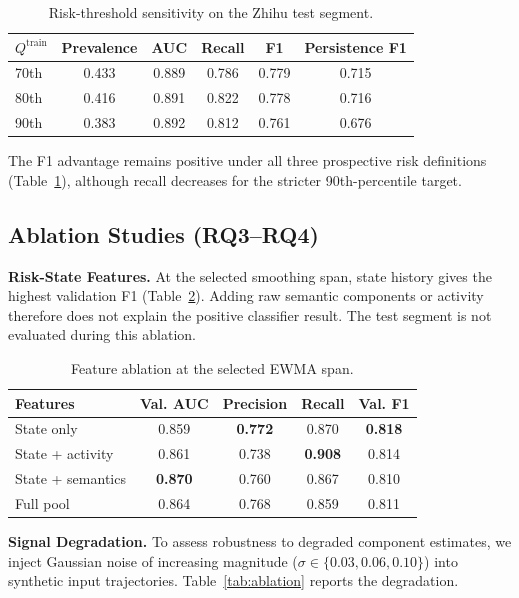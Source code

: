 \documentclass[11pt,a4paper]{article}
\begin{document}
\begin{table}[ht]
\centering
\caption{Risk-threshold sensitivity on the Zhihu test segment.}
\label{tab:threshold_sensitivity}
\begin{tabular}{lccccc}
\toprule
$Q^{\mathrm{train}}$ & \textbf{Prevalence} & \textbf{AUC} & \textbf{Recall} & \textbf{F1} & \textbf{Persistence F1} \\
\midrule
70th & 0.433 & 0.889 & 0.786 & 0.779 & 0.715 \\
80th & 0.416 & 0.891 & 0.822 & 0.778 & 0.716 \\
90th & 0.383 & 0.892 & 0.812 & 0.761 & 0.676 \\
\bottomrule
\end{tabular}
\end{table}

The F1 advantage remains positive under all three prospective risk definitions (Table~\ref{tab:threshold_sensitivity}), although recall decreases for the stricter 90th-percentile target.

\subsection{Ablation Studies (RQ3--RQ4)}

\textbf{Risk-State Features.} At the selected smoothing span, state history gives the highest validation F1 (Table~\ref{tab:feature_ablation}). Adding raw semantic components or activity therefore does not explain the positive classifier result. The test segment is not evaluated during this ablation.

\begin{table}[ht]
\centering
\caption{Feature ablation at the selected EWMA span.}
\label{tab:feature_ablation}
\begin{tabular}{lcccc}
\toprule
\textbf{Features} & \textbf{Val. AUC} & \textbf{Precision} & \textbf{Recall} & \textbf{Val. F1} \\
\midrule
State only & 0.859 & \textbf{0.772} & 0.870 & \textbf{0.818} \\
State + activity & 0.861 & 0.738 & \textbf{0.908} & 0.814 \\
State + semantics & \textbf{0.870} & 0.760 & 0.867 & 0.810 \\
Full pool & 0.864 & 0.768 & 0.859 & 0.811 \\
\bottomrule
\end{tabular}
\end{table}

\textbf{Signal Degradation.} To assess robustness to degraded component estimates, we inject Gaussian noise of increasing magnitude ($\sigma \in \{0.03, 0.06, 0.10\}$) into synthetic input trajectories. Table~\ref{tab:ablation} reports the degradation.
\end{document}
